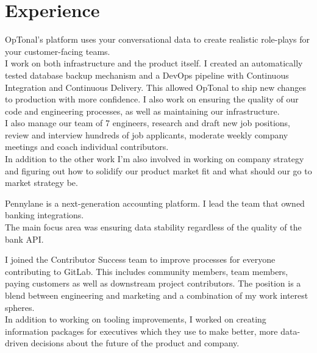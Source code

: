 \documentclass[]{matija-resume}
\begin{document}
\begin{minipage}[t]{1.0\textwidth}


\section{Experience}

\vspace{\topsep}
OpTonal's platform uses your conversational data to create realistic role-plays for your customer-facing teams. \\
\vspace{\topsep}
I work on both infrastructure and the product itself. I created an automatically tested database backup mechanism and a DevOps pipeline with Continuous Integration and Continuous Delivery. This allowed OpTonal to ship new changes to production with more confidence. I also work on ensuring the quality of our code and engineering processes, as well as maintaining our infrastructure.\\
\vspace{\topsep}
I also manage our team of 7 engineers, research and draft new job positions, review and interview hundreds of job applicants, moderate weekly company meetings and coach individual contributors.\\
\vspace{\topsep}
In addition to the other work I'm also involved in working on company strategy and figuring out how to solidify our product market fit and what should our go to market strategy be.
\vspace{\topsep}

\sectionsep

\vspace{\topsep}
Pennylane is a next-generation accounting platform. I lead the team that owned banking integrations.\\
The main focus area was ensuring data stability regardless of the quality of the bank API.
\sectionsep

\vspace{\topsep}
I joined the Contributor Success team to improve processes for everyone contributing to GitLab. This includes community members, team members, paying customers as well as downstream project contributors. The position is a blend between engineering and marketing and a combination of my work interest spheres.\\
\vspace{\topsep}
In addition to working on tooling improvements, I worked on creating information packages for executives which they use to make better, more data-driven decisions about the future of the product and company.
\sectionsep


\end{minipage}
\end{document}
